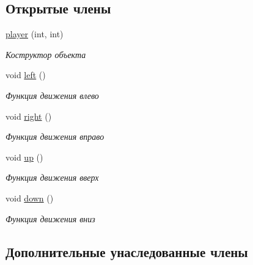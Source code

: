 \subsection*{Открытые члены}
\begin{DoxyCompactItemize}
\item 
\mbox{\hyperlink{classplayer_ab1d9c2ebef05e45ed3c25561d8704111}{player}} (int, int)
\begin{DoxyCompactList}\small\item\em Коструктор объекта \end{DoxyCompactList}\item 
\mbox{\label{classplayer_a92daafe8555040c730695f1d3e768117}} 
void \mbox{\hyperlink{classplayer_a92daafe8555040c730695f1d3e768117}{left}} ()
\begin{DoxyCompactList}\small\item\em Функция движения влево \end{DoxyCompactList}\item 
\mbox{\label{classplayer_ae2b3482d0e525c9f58caa01431836f7e}} 
void \mbox{\hyperlink{classplayer_ae2b3482d0e525c9f58caa01431836f7e}{right}} ()
\begin{DoxyCompactList}\small\item\em Функция движения вправо \end{DoxyCompactList}\item 
\mbox{\label{classplayer_a3b29bfd1cef8c8934fa0c5ffc93fd539}} 
void \mbox{\hyperlink{classplayer_a3b29bfd1cef8c8934fa0c5ffc93fd539}{up}} ()
\begin{DoxyCompactList}\small\item\em Функция движения вверх \end{DoxyCompactList}\item 
\mbox{\label{classplayer_a7bc7d32663c11671b181a120844e0efc}} 
void \mbox{\hyperlink{classplayer_a7bc7d32663c11671b181a120844e0efc}{down}} ()
\begin{DoxyCompactList}\small\item\em Функция движения вниз \end{DoxyCompactList}\end{DoxyCompactItemize}
\subsection*{Дополнительные унаследованные члены}


